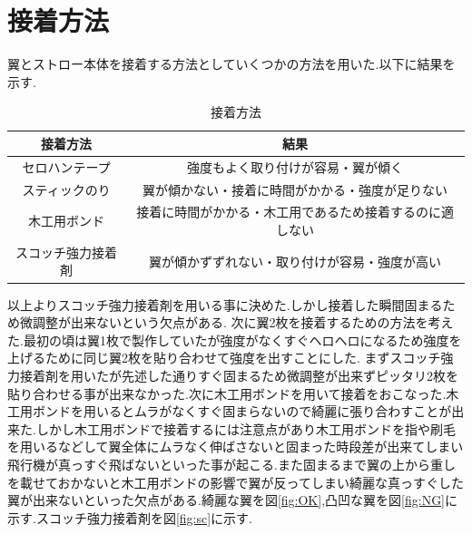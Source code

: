 \section{接着方法}
翼とストロー本体を接着する方法としていくつかの方法を用いた.以下に結果を示す.
\begin{table}[H]
 \begin{center}
   \caption{接着方法}
   \begin{tabular}[htbp]{|c|c|}
    \hline
    接着方法&結果 \\
    \hline
    セロハンテープ&強度もよく取り付けが容易・翼が傾く\\
    \hline
    スティックのり&翼が傾かない・接着に時間がかかる・強度が足りない\\
    \hline
    木工用ボンド&接着に時間がかかる・木工用であるため接着するのに適しない\\
    \hline
    スコッチ強力接着剤&翼が傾かずずれない・取り付けが容易・強度が高い\\
    \hline
    \end{tabular}
   \label{tab:experiment}
  \end{center}
\end{table}

以上よりスコッチ強力接着剤を用いる事に決めた.しかし接着した瞬間固まるため微調整が出来ないという欠点がある.
次に翼2枚を接着するための方法を考えた.最初の頃は翼1枚で製作していたが強度がなくすぐヘロヘロになるため強度を上げるために同じ翼2枚を貼り合わせて強度を出すことにした.
まずスコッチ強力接着剤を用いたが先述した通りすぐ固まるため微調整が出来ずピッタリ2枚を貼り合わせる事が出来なかった.次に木工用ボンドを用いて接着をおこなった.木工用ボンドを用いるとムラがなくすぐ固まらないので綺麗に張り合わすことが出来た.しかし木工用ボンドで接着するには注意点があり木工用ボンドを指や刷毛を用いるなどして翼全体にムラなく伸ばさないと固まった時段差が出来てしまい飛行機が真っすぐ飛ばないといった事が起こる.また固まるまで翼の上から重しを載せておかないと木工用ボンドの影響で翼が反ってしまい綺麗な真っすぐした翼が出来ないといった欠点がある.綺麗な翼を図\ref{fig:OK},凸凹な翼を図\ref{fig:NG}に示す.スコッチ強力接着剤を図\ref{fig:sc}に示す.


